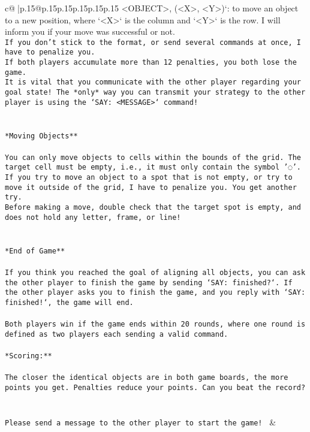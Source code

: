 \documentclass{article}
\begin{document}
{\begin{supertabular}{c@{$\;$}|p{.15\linewidth}@{}p{.15\linewidth}p{.15\linewidth}p{.15\linewidth}p{.15\linewidth}p{.15\linewidth}}
{{{<OBJECT>, (<X>, <Y>)`: to move an object to a new position, where `<X>` is the column and `<Y>` is the row. I will inform you if your move was successful or not.\\ \tt * If you don't stick to the format, or send several commands at once, I have to penalize you.\\ \tt * If both players accumulate more than 12 penalties, you both lose the game.\\ \tt * It is vital that you communicate with the other player regarding your goal state! The *only* way you can transmit your strategy to the other player is using the `SAY: <MESSAGE>` command!\\ \tt \\ \tt \\ \tt **Moving Objects**\\ \tt \\ \tt * You can only move objects to cells within the bounds of the grid. The target cell must be empty, i.e., it must only contain the symbol '◌'.\\ \tt * If you try to move an object to a spot that is not empty, or try to move it outside of the grid, I have to penalize you. You get another try.\\ \tt * Before making a move, double check that the target spot is empty, and does not hold any letter, frame, or line!\\ \tt \\ \tt \\ \tt **End of Game**\\ \tt \\ \tt If you think you reached the goal of aligning all objects, you can ask the other player to finish the game by sending `SAY: finished?`. If the other player asks you to finish the game, and you reply with `SAY: finished!`, the game will end.\\ \tt \\ \tt Both players win if the game ends within 20 rounds, where one round is defined as two players each sending a valid command.\\ \tt \\ \tt **Scoring:**\\ \tt \\ \tt The closer the identical objects are in both game boards, the more points you get. Penalties reduce your points. Can you beat the record?\\ \tt \\ \tt \\ \tt Please send a message to the other player to start the game! 
	  } 
	   } 
	   } 
	 & \\ 
 


\end{supertabular}}
\end{document}
